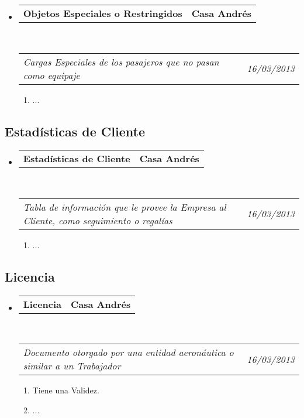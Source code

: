 \documentclass[10pt,letterpaper]{article}
\makeatletter
\newcommand{\headerrow}[2]
{\begin{tabular*}{\linewidth}{l@{\extracolsep{\fill}}r}
	#1 &
	#2 \\
\end{tabular*}}
\makeatother
\begin{document}
\begin{itemize}
	\parskip=0.1em

	\item
	\headerrow
		{\textbf{Objetos Especiales o Restringidos}}
		{\textbf{Casa Andrés}}
	\\
	\headerrow
		{\emph{Cargas Especiales de los pasajeros que no pasan como equipaje}}
		{\emph{16/03/2013}}
	\begin{enumerate}
		\item ...
	\end{enumerate}

\end{itemize}

\subsection*{Estadísticas de Cliente}

\begin{itemize}
	\parskip=0.1em

	\item
	\headerrow
		{\textbf{Estadísticas de Cliente}}
		{\textbf{Casa Andrés}}
	\\
	\headerrow
		{\emph{Tabla de información que le provee la Empresa al Cliente, como seguimiento o regalías}}
		{\emph{16/03/2013}}
	\begin{enumerate}
		\item ...
	\end{enumerate}

\end{itemize}

\subsection*{Licencia}

\begin{itemize}
	\parskip=0.1em

	\item
	\headerrow
		{\textbf{Licencia}}
		{\textbf{Casa Andrés}}
	\\
	\headerrow
		{\emph{Documento otorgado por una entidad aeronáutica o similar a un Trabajador}}
		{\emph{16/03/2013}}
	\begin{enumerate}
		\item Tiene una Validez.
		\item ...
	\end{enumerate}

\end{itemize}
\end{document}
